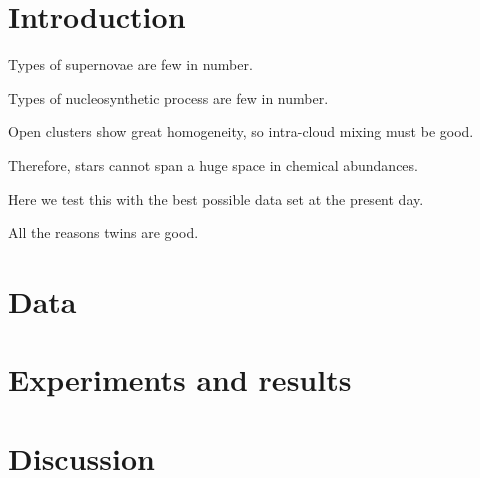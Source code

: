 \documentclass[12pt]{article}
\begin{document}
\section{Introduction}

Types of supernovae are few in number.

Types of nucleosynthetic process are few in number.

Open clusters show great homogeneity, so intra-cloud mixing must be good.

Therefore, stars cannot span a huge space in chemical abundances.

Here we test this with the best possible data set at the present day.

All the reasons twins are good.

\section{Data}

\section{Experiments and results}

\section{Discussion}
\end{document}
